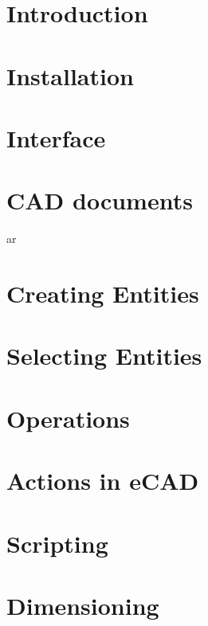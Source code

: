 \documentclass[12pt]{article}
\begin{document}
\begin{screen}
\ppttitle
\end{screen}
\footskip 0.7cm
\newpage


\newpage
\section{Introduction}

\newpage
\section{Installation}

\newpage
\section{Interface}

\newpage
\section{CAD documents}
ar
\newpage
\section{Creating Entities}

\newpage
\section{Selecting Entities}

\newpage
\section{Operations}

\newpage
\section{Actions in eCAD}

\newpage
\section{Scripting}

\newpage
\section{Dimensioning}

\end{document}
